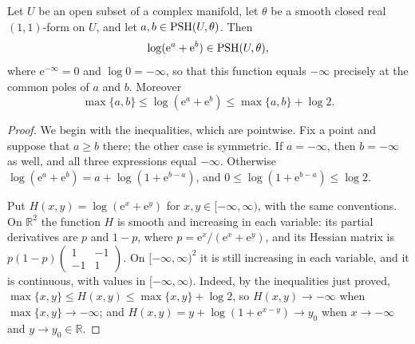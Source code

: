 \begin{lemma}\label{lem:background-logarithmic-sum}
Let $U$ be an open subset of a complex manifold, let $\theta$ be a smooth closed real $(1,1)$-form on $U$, and let $a,b\in\mathrm{PSH}(U,\theta)$. Then
\[
 \log(\mathrm e^a+\mathrm e^b)\in\mathrm{PSH}(U,\theta),
\]
where $\mathrm e^{-\infty}=0$ and $\log0=-\infty$, so that this function equals $-\infty$ precisely at the common poles of $a$ and $b$. Moreover
\[
 \max\{a,b\}\leq\log(\mathrm e^a+\mathrm e^b)\leq\max\{a,b\}+\log2.
\]
\end{lemma}
\begin{proof}
We begin with the inequalities, which are pointwise. Fix a point and suppose that $a\geq b$ there; the other case is symmetric. If $a=-\infty$, then $b=-\infty$ as well, and all three expressions equal $-\infty$. Otherwise $\log(\mathrm e^a+\mathrm e^b)=a+\log(1+\mathrm e^{b-a})$, and $0\leq\log(1+\mathrm e^{b-a})\leq\log2$.

Put $H(x,y)=\log(\mathrm e^x+\mathrm e^y)$ for $x,y\in[-\infty,\infty)$, with the same conventions. On $\mathbb R^2$ the function $H$ is smooth and increasing in each variable: its partial derivatives are $p$ and $1-p$, where $p=\mathrm e^x/(\mathrm e^x+\mathrm e^y)$, and its Hessian matrix is $p(1-p)\left(\begin{smallmatrix}1&-1\\-1&1\end{smallmatrix}\right)$. On $[-\infty,\infty)^2$ it is still increasing in each variable, and it is continuous, with values in $[-\infty,\infty)$. Indeed, by the inequalities just proved, $\max\{x,y\}\leq H(x,y)\leq\max\{x,y\}+\log2$, so $H(x,y)\to-\infty$ when $\max\{x,y\}\to-\infty$; and $H(x,y)=y+\log(1+\mathrm e^{x-y})\to y_0$ when $x\to-\infty$ and $y\to y_0\in\mathbb R$.


\end{proof}

